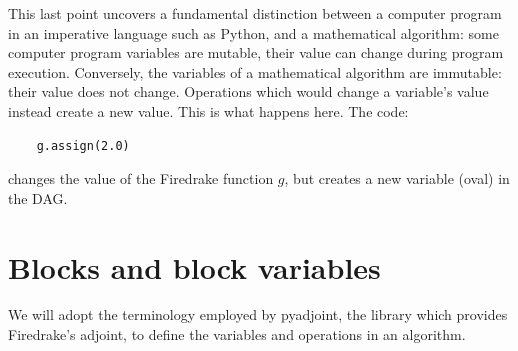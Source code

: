 \documentclass[a4paper,12pt]{report}
\begin{document}
This last point uncovers a fundamental distinction between a computer program
in an imperative language such as Python, and a mathematical algorithm: some
computer program variables are mutable, their value can change during program
execution. Conversely, the variables of a mathematical algorithm are immutable:
their value does not change. Operations which would change a variable's value
instead create a new value. This is what happens here. The code:

\begin{verbatim}
    g.assign(2.0)
\end{verbatim}

changes the value of the Firedrake function $g$, but creates a new variable
(oval) in the DAG.

\section{Blocks and block variables}


We will adopt the terminology employed by pyadjoint, the library which provides
Firedrake's adjoint, to define the variables and operations in an algorithm.
\end{document}
